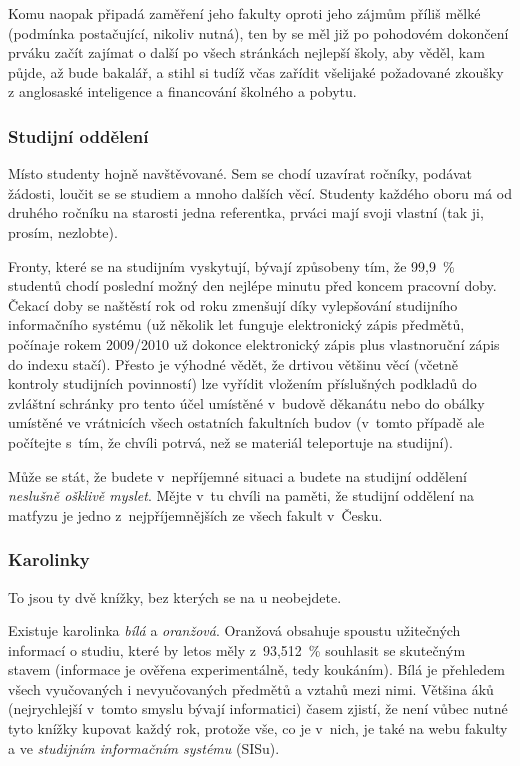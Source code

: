 Komu naopak připadá zaměření jeho fakulty oproti jeho zájmům
příliš mělké (podmínka postačující, nikoliv nutná), ten by se měl
již po pohodovém dokončení prváku začít zajímat o další po všech
stránkách nejlepší školy, aby věděl, kam půjde, až bude bakalář,
a stihl si tudíž včas zařídit všelijaké požadované zkoušky
z anglosaské inteligence a financování školného a pobytu.

\subsubsection{Studijní oddělení}

Místo studenty hojně navštěvované. Sem se chodí uzavírat ročníky,
podávat žádosti, loučit se se studiem a mnoho dalších věcí.
Studenty každého oboru má od druhého ročníku na starosti jedna
referentka, prváci mají svoji vlastní (tak ji, prosím, nezlobte).


Fronty, které se na studijním vyskytují, bývají způsobeny tím, že
99,9~\% studentů chodí poslední možný den nejlépe minutu před
koncem pracovní doby. Čekací doby se naštěstí rok od roku zmenšují
díky vylepšování studijního informačního systému (už několik let
funguje elektronický zápis předmětů, počínaje rokem 2009/2010 už
dokonce elektronický zápis plus vlastnoruční zápis do indexu
stačí). Přesto je výhodné vědět, že drtivou většinu věcí (včetně
kontroly studijních povinností) lze vyřídit vložením příslušných
podkladů do zvláštní schránky pro tento účel umístěné v~budově
děkanátu nebo do obálky umístěné ve vrátnicích všech ostatních
fakultních budov (v~tomto případě ale počítejte s~tím, že chvíli
potrvá, než se materiál teleportuje na studijní).

Může se stát, že budete v~nepříjemné situaci a budete na studijní oddělení {\it neslušně ošklivě myslet}. Mějte v~tu chvíli na paměti, že studijní oddělení na matfyzu je jedno z~nejpříjemnějších ze všech fakult v~Česku.

\subsubsection{Karolinky}

To jsou ty dvě knížky, 
bez kterých se na \Mfz{}u neobejdete. 

Existuje karolinka {\it
bílá\/} a {\it oranžová}. Oranžová obsahuje spoustu užitečných
informací o studiu, které by letos měly z~93,512~\% souhlasit se
skutečným stavem (informace je ověřena experimentálně, tedy
koukáním). Bílá je přehledem všech vyučovaných i nevyučovaných
předmětů a vztahů mezi nimi. Většina \mfz{}áků (nejrychlejší
v~tomto smyslu bývají informatici) časem zjistí, že není vůbec
nutné tyto knížky kupovat každý rok, protože vše, co je v~nich, je
také na webu fakulty a ve {\it studijním informačním systému}
(SISu).


